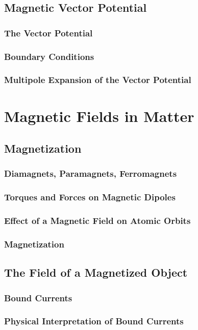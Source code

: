 \documentclass{article}
\begin{document}
\subsection{Magnetic Vector Potential}
\subsubsection{The Vector Potential}
\subsubsection{Boundary Conditions}
\subsubsection{Multipole Expansion of the Vector Potential}


\section{Magnetic Fields in Matter}
\subsection{Magnetization}
\subsubsection{Diamagnets, Paramagnets, Ferromagnets}
\subsubsection{Torques and Forces on Magnetic Dipoles}
\subsubsection{Effect of a Magnetic Field on Atomic Orbits}
\subsubsection{Magnetization}

\subsection{The Field of a Magnetized Object}
\subsubsection{Bound Currents}
\subsubsection{Physical Interpretation of Bound Currents}
\end{document}
